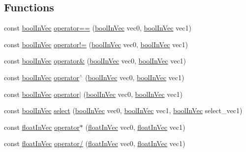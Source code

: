 \subsection*{Functions}
\begin{DoxyCompactItemize}
\item 
const \hyperlink{classVectormath_1_1boolInVec}{bool\-In\-Vec} \hyperlink{namespaceVectormath_af61a39b99ba2e43f0f60234811842ede}{operator==} (\hyperlink{classVectormath_1_1boolInVec}{bool\-In\-Vec} vec0, \hyperlink{classVectormath_1_1boolInVec}{bool\-In\-Vec} vec1)
\item 
const \hyperlink{classVectormath_1_1boolInVec}{bool\-In\-Vec} \hyperlink{namespaceVectormath_ac95e815e8276bbdf393e8f0088994854}{operator!=} (\hyperlink{classVectormath_1_1boolInVec}{bool\-In\-Vec} vec0, \hyperlink{classVectormath_1_1boolInVec}{bool\-In\-Vec} vec1)
\item 
const \hyperlink{classVectormath_1_1boolInVec}{bool\-In\-Vec} \hyperlink{namespaceVectormath_a52374f6bab0866216fee7a15c5440a2f}{operator\&} (\hyperlink{classVectormath_1_1boolInVec}{bool\-In\-Vec} vec0, \hyperlink{classVectormath_1_1boolInVec}{bool\-In\-Vec} vec1)
\item 
const \hyperlink{classVectormath_1_1boolInVec}{bool\-In\-Vec} \hyperlink{namespaceVectormath_a088b1f85ec2373331049801d915cd40d}{operator$^\wedge$} (\hyperlink{classVectormath_1_1boolInVec}{bool\-In\-Vec} vec0, \hyperlink{classVectormath_1_1boolInVec}{bool\-In\-Vec} vec1)
\item 
const \hyperlink{classVectormath_1_1boolInVec}{bool\-In\-Vec} \hyperlink{namespaceVectormath_a5cc6edcd6a0bb41abde425587ccdd59c}{operator$\vert$} (\hyperlink{classVectormath_1_1boolInVec}{bool\-In\-Vec} vec0, \hyperlink{classVectormath_1_1boolInVec}{bool\-In\-Vec} vec1)
\item 
const \hyperlink{classVectormath_1_1boolInVec}{bool\-In\-Vec} \hyperlink{namespaceVectormath_a52c8b1042096a5d92733738df1963f78}{select} (\hyperlink{classVectormath_1_1boolInVec}{bool\-In\-Vec} vec0, \hyperlink{classVectormath_1_1boolInVec}{bool\-In\-Vec} vec1, \hyperlink{classVectormath_1_1boolInVec}{bool\-In\-Vec} select\-\_\-vec1)
\item 
const \hyperlink{classVectormath_1_1floatInVec}{float\-In\-Vec} \hyperlink{namespaceVectormath_aaa5e6e7b6c6975ee0da30e4ff53f8c27}{operator$\ast$} (\hyperlink{classVectormath_1_1floatInVec}{float\-In\-Vec} vec0, \hyperlink{classVectormath_1_1floatInVec}{float\-In\-Vec} vec1)
\item 
const \hyperlink{classVectormath_1_1floatInVec}{float\-In\-Vec} \hyperlink{namespaceVectormath_a13940df870464a7f7e7c6d491368091d}{operator/} (\hyperlink{classVectormath_1_1floatInVec}{float\-In\-Vec} vec0, \hyperlink{classVectormath_1_1floatInVec}{float\-In\-Vec} vec1)

\end{DoxyCompactItemize}
